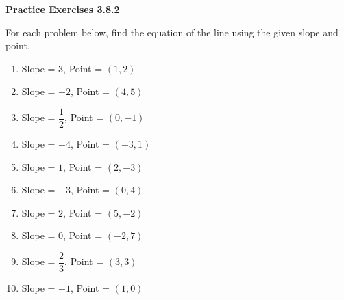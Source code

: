  \vspace{1ex}
\noindent\textbf{Practice Exercises 3.8.2}

\vspace{0.75ex}

For each problem below, find the equation of the line using the given slope and point.
\begin{multicols}{2}
\begin{enumerate}[noitemsep, label = \color{blue}\arabic*. ]
    \item Slope = $3$, Point = $(1, 2)$
    \item Slope = $-2$, Point = $(4, 5)$
    \item Slope = $\dfrac{1}{2}$, Point = $(0, -1)$
    \item Slope = $-4$, Point = $(-3, 1)$
    \item Slope = $1$, Point = $(2, -3)$
    \item Slope = $-3$, Point = $(0, 4)$
    \item Slope = $2$, Point = $(5, -2)$
    \item Slope = $0$, Point = $(-2, 7)$
    \item Slope = $\dfrac{2}{3}$, Point = $(3, 3)$
    \item Slope = $-1$, Point = $(1, 0)$
\end{enumerate}
\end{multicols}

